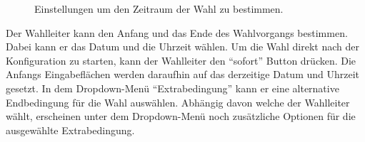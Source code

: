 \documentclass[parskip=full,11pt,twoside]{scrartcl}
\begin{document}
\begin{figure}[H]
	\caption{\label{fig:wlltr-time}
		Einstellungen um den Zeitraum der \gls{Wahl} zu bestimmen.
	}
\end{figure}
Der \gls{Wahlleiter} kann den Anfang und das Ende des Wahlvorgangs bestimmen. Dabei kann er das Datum und die Uhrzeit wählen. Um die \gls{Wahl} direkt nach der \gls{Konfiguration} zu starten, kann der \gls{Wahlleiter} den \enquote{sofort} Button drücken. Die Anfangs Eingabeflächen werden daraufhin auf das derzeitige Datum und Uhrzeit gesetzt.
In dem Dropdown-Menü \enquote{Extrabedingung} kann er eine alternative Endbedingung für die \gls{Wahl} auswählen.
Abhängig davon welche der \gls{Wahlleiter} wählt, erscheinen unter dem Dropdown-Menü noch zusätzliche Optionen für die ausgewählte Extrabedingung.
\end{document}
